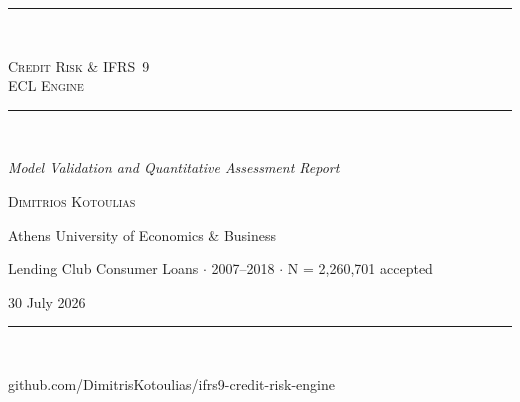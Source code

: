 \documentclass[11pt,a4paper]{article}
\begin{document}
\begin{titlepage}
  \centering
  \vspace*{4cm}
  \rule{0.6\linewidth}{0.6pt}\\[1.5em]
  {\fontsize{26}{30}\selectfont\scshape Credit Risk \& IFRS~9\\[6pt] ECL Engine\par}
  \vspace{1em}
  \rule{0.6\linewidth}{0.6pt}\\[2em]
  {\large\itshape Model Validation and Quantitative Assessment Report\par}
  \vspace{4cm}
  {\large\scshape Dimitrios Kotoulias\par}
  {\small Athens University of Economics \& Business\par}
  \vspace{0.6em}
  {\small Lending Club Consumer Loans $\cdot$ 2007--2018 $\cdot$ N = 2,260,701 accepted\par}
  \vspace{0.4em}
  {\small 30 July 2026\par}
  \vfill
  \rule{\linewidth}{0.4pt}\\[0.5em]
  {\footnotesize\ttfamily github.com/DimitrisKotoulias/ifrs9-credit-risk-engine\par}
\end{titlepage}

\newpage
\begin{abstract}
This report presents the model development, validation, and risk quantification
for a retail credit underwriting engine trained on the LendingClub 2007--2018
loan portfolio (2,260,701 accepted loans, of which 1,369,566 have a resolved
good/bad outcome and 992,661 form the modelling population after the train/OOT grey
zone is excluded; 27,648,741 rejected applications).
The Probability of Default (PD) scorecard achieves an out-of-time Gini of
\textbf{0.4007} (AUC = 0.7003), with Population Stability
Index PSI = 0.0032 (model stability: GREEN).
The two-stage Loss Given Default model yields mean LGD = 0.8931
and downturn LGD = 1.0000 (90th percentile, Basel-conservative).
Basel IRB Risk-Weighted Assets total \$6,031,656,591 at 161.7\% RWA density.
IFRS 9 Expected Credit Loss provisions total \$1,350,551,382 (coverage: 36.210\%).
\end{abstract}

\tableofcontents
\newpage

\end{document}
